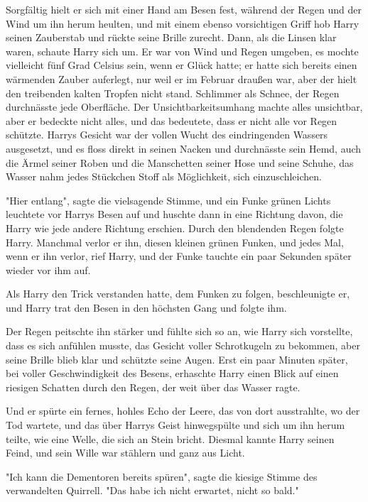 {Sorgfältig hielt er sich mit einer Hand am Besen fest, während der Regen und der Wind um ihn herum heulten, und mit einem ebenso vorsichtigen Griff hob Harry seinen Zauberstab und rückte seine Brille zurecht. Dann, als die Linsen klar waren, schaute Harry sich um. Er war von Wind und Regen umgeben, es mochte vielleicht fünf Grad Celsius sein, wenn er Glück hatte; er hatte sich bereits einen wärmenden Zauber auferlegt, nur weil er im Februar draußen war, aber der hielt den treibenden kalten Tropfen nicht stand. Schlimmer als Schnee, der Regen durchnässte jede Oberfläche. Der Unsichtbarkeitsumhang machte alles unsichtbar, aber er bedeckte nicht alles, und das bedeutete, dass er nicht alle vor Regen schützte. Harrys Gesicht war der vollen Wucht des eindringenden Wassers ausgesetzt, und es floss direkt in seinen Nacken und durchnässte sein Hemd, auch die Ärmel seiner Roben und die Manschetten seiner Hose und seine Schuhe, das Wasser nahm jedes Stückchen Stoff als Möglichkeit, sich einzuschleichen.

"Hier entlang", sagte die vielsagende Stimme, und ein Funke grünen Lichts leuchtete vor Harrys Besen auf und huschte dann in eine Richtung davon, die Harry wie jede andere Richtung erschien. Durch den blendenden Regen folgte Harry. Manchmal verlor er ihn, diesen kleinen grünen Funken, und jedes Mal, wenn er ihn verlor, rief Harry, und der Funke tauchte ein paar Sekunden später wieder vor ihm auf.

Als Harry den Trick verstanden hatte, dem Funken zu folgen, beschleunigte er, und Harry trat den Besen in den höchsten Gang und folgte ihm.

Der Regen peitschte ihn stärker und fühlte sich so an, wie Harry sich vorstellte, dass es sich anfühlen musste, das Gesicht voller Schrotkugeln zu bekommen, aber seine Brille blieb klar und schützte seine Augen. Erst ein paar Minuten später, bei voller Geschwindigkeit des Besens, erhaschte Harry einen Blick auf einen riesigen Schatten durch den Regen, der weit über das Wasser ragte.

Und er spürte ein fernes, hohles Echo der Leere, das von dort ausstrahlte, wo der Tod wartete, und das über Harrys Geist hinwegspülte und sich um ihn herum teilte, wie eine Welle, die sich an Stein bricht. Diesmal kannte Harry seinen Feind, und sein Wille war stählern und ganz aus Licht.

"Ich kann die Dementoren bereits spüren", sagte die kiesige Stimme des verwandelten Quirrell. "Das habe ich nicht erwartet, nicht so bald."

}
